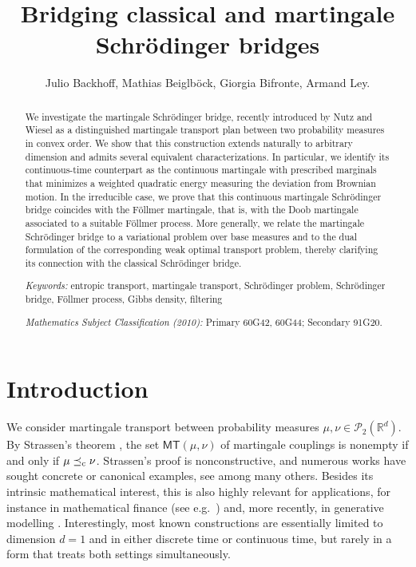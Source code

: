 \documentclass[reqno, a4paper]{amsart}
\theoremstyle{plain}
\theoremstyle{definition}
\theoremstyle{remark}
\numberwithin{equation}{section}
\numberwithin{theorem}{section}
\newcommand{\R}{\mathbb{R}}
\newcommand{\MT}{\mathsf{MT}}
\newcommand{\lc}{\preceq_{\textnormal{c}}}
\newcommand{\PP}{\mathcal{P}}
\begin{document}
	
	
	
	\title{Bridging classical and martingale Schrödinger bridges}
	
	\author{Julio Backhoff, Mathias Beiglböck, Giorgia Bifronte, Armand Ley.}
	
	\begin{abstract} 
		
		We investigate the martingale Schrödinger bridge, recently introduced by Nutz and Wiesel as a distinguished martingale transport plan between two probability measures in convex order. We show that this construction extends naturally to arbitrary dimension and admits several equivalent characterizations. In particular, we identify its continuous-time counterpart as the continuous martingale with prescribed marginals that minimizes a weighted quadratic energy measuring the deviation  from  Brownian motion. In the irreducible case, we prove that this continuous martingale Schrödinger bridge coincides with the Föllmer martingale, that is, with the Doob martingale associated to a suitable Föllmer process. More generally, we relate the martingale Schrödinger bridge to a variational problem over base measures and to the dual formulation of the corresponding weak optimal transport problem, thereby clarifying its connection with the classical Schrödinger bridge.
		
		\bigskip
		
		\noindent\emph{Keywords:} entropic transport, martingale transport, Schrödinger problem, Schrödinger bridge, Föllmer process, Gibbs density, filtering 
		
		\smallskip
		
		\noindent\emph{Mathematics Subject Classification (2010):} Primary 60G42, 60G44; Secondary 91G20.
	\end{abstract}
	
	\maketitle
	
	
	\section{Introduction}
	
	We consider martingale transport between probability measures \(\mu,\nu\in\PP_2(\R^d)\).
	By Strassen's theorem \cite{St65}, the set \(\MT(\mu,\nu)\) of martingale couplings is nonempty if and only if \(\mu\lc\nu\).
	Strassen's proof is nonconstructive, and numerous works have sought concrete or canonical examples, see \cite{BeJu16, BeCoHu14, GhKiLi19, BaBeHuKa20, HuTr17, HeTo13, He19} among many others.
	Besides its intrinsic mathematical interest, this is also highly relevant for applications, for instance in mathematical finance (see e.g.\ \cite{CoHe21, GuLoWa19, AcMaPa25, HaJoLoObPa23}) and, more recently, in generative modelling \cite{AlHLLoMaPhTo26b, AlHLLoMaPhTo26a, DMPhZa26}.
	Interestingly, most known constructions are essentially limited to dimension \(d=1\) and in  either discrete time or continuous time, but rarely in a form that treats both settings simultaneously.
	
\end{document}
